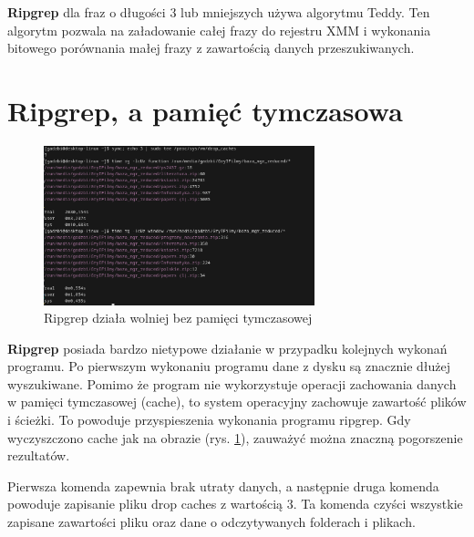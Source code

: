 \textbf{Ripgrep} dla fraz o długości 3 lub mniejszych używa algorytmu Teddy. Ten algorytm
pozwala na załadowanie całej frazy do rejestru XMM i wykonania bitowego 
porównania małej frazy z zawartością danych przeszukiwanych.

\section{Ripgrep, a pamięć tymczasowa}


\begin{figure}[h]
    \centering
    \includegraphics[width=0.7\textwidth]{./images/ripgrep-clear-cache-slow.png}
    \caption{Ripgrep działa wolniej bez pamięci tymczasowej}
    \label{fig:ClearCacheRipgrep}
\end{figure}

\textbf{Ripgrep} posiada bardzo nietypowe działanie w przypadku kolejnych wykonań 
programu. Po pierwszym wykonaniu programu dane z dysku są znacznie dłużej
wyszukiwane. Pomimo że program nie wykorzystuje operacji zachowania danych
w pamięci tymczasowej (cache), to system operacyjny zachowuje zawartość plików 
i ścieżki. To powoduje przyspieszenia wykonania programu ripgrep. Gdy 
wyczyszczono cache jak na obrazie (rys. \ref{fig:ClearCacheRipgrep}),
zauważyć można znaczną pogorszenie rezultatów.

Pierwsza komenda zapewnia brak utraty
danych, a następnie druga komenda powoduje zapisanie pliku drop caches z wartością 3.
Ta komenda czyści wszystkie zapisane zawartości pliku oraz dane o odczytywanych
folderach i plikach.


